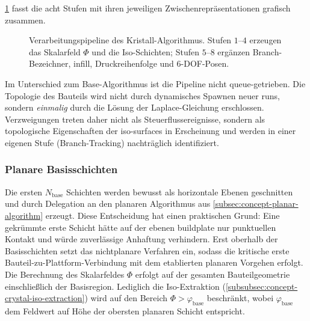                 \cref{fig:concept-crystal-pipeline} fasst die acht Stufen mit ihren jeweiligen Zwischenrepräsentationen grafisch zusammen.

                \begin{figure}[ht]
                    \centering
                    \resizebox{\linewidth}{!}{
                        
                    }
                    \caption[Pipeline des Kristall-Algorithmus mit acht zustandslosen Stufen.]{%
                        Verarbeitungspipeline des Kristall-Algorithmus.
                        Stufen $1$--$4$ erzeugen das Skalarfeld $\Phi$ und die Iso-Schichten; Stufen $5$--$8$ ergänzen Branch-Bezeichner, \gls{infill}, Druckreihenfolge und 6-\ac{DOF}-Posen.%
                    }
                    \label{fig:concept-crystal-pipeline}
                \end{figure}

                Im Unterschied zum Base-Algorithmus ist die Pipeline nicht queue-getrieben.
                Die Topologie des Bauteils wird nicht durch dynamisches Spawnen neuer \glspl{run}, sondern \emph{einmalig} durch die Lösung der Laplace-Gleichung erschlossen.
                Verzweigungen treten daher nicht als Steuerflussereignisse, sondern als topologische Eigenschaften der \glspl{iso-surface} in Erscheinung und werden in einer eigenen Stufe (Branch-Tracking) nachträglich identifiziert.

            \subsubsection{Planare Basisschichten}\label{subsubsec:concept-crystal-planar-base}
                Die ersten $N_\text{base}$ Schichten werden bewusst als horizontale Ebenen geschnitten und durch Delegation an den planaren Algorithmus aus \cref{subsec:concept-planar-algorithm} erzeugt.
                Diese Entscheidung hat einen praktischen Grund: Eine gekrümmte erste Schicht hätte auf der ebenen \gls{buildplate} nur punktuellen Kontakt und würde zuverlässige Anhaftung verhindern.
                Erst oberhalb der Basisschichten setzt das nichtplanare Verfahren ein, sodass die kritische erste Bauteil-zu-Plattform-Verbindung mit dem etablierten planaren Vorgehen erfolgt.
                Die Berechnung des Skalarfeldes $\Phi$ erfolgt auf der gesamten Bauteilgeometrie einschließlich der Basisregion.
                Lediglich die Iso-Extraktion (\cref{subsubsec:concept-crystal-iso-extraction}) wird auf den Bereich $\Phi > \varphi_\text{base}$ beschränkt, wobei $\varphi_\text{base}$ dem Feldwert auf Höhe der obersten planaren Schicht entspricht.

